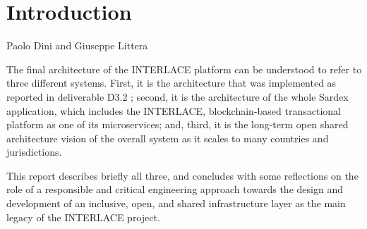 \chapter{Introduction}
\label{ch:Introduction}

\vspace{-1cm}
\begin{center}
Paolo Dini and Giuseppe Littera
\end{center}

The final architecture of the INTERLACE platform can be understood to refer to three different systems. First, it is the architecture that was implemented as reported in deliverable D3.2 \cite{INTERLACE_D32}; second, it is the architecture of the whole Sardex application, which includes the INTERLACE, blockchain-based transactional platform as one of its microservices; and, third, it is the long-term open shared architecture vision of the overall system as it scales to many countries and jurisdictions. 

This report describes briefly all three, and concludes with some reflections on the role of a responsible and critical engineering approach towards the design and development of an inclusive, open, and shared infrastructure layer as the main legacy of the INTERLACE project.


















\newpage











